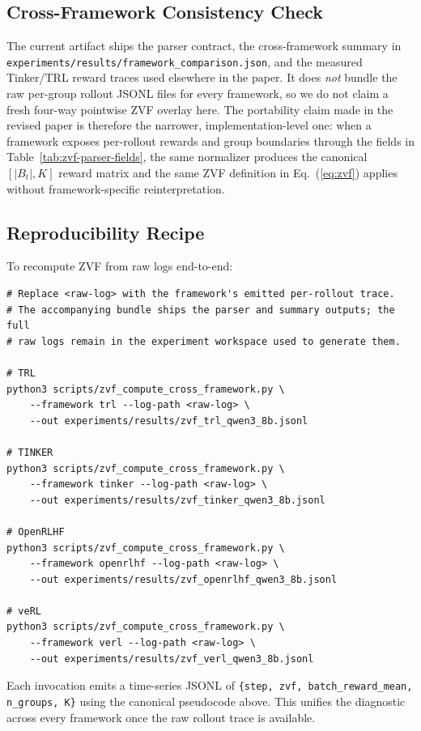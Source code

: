 \documentclass{article}
\begin{document}
\subsection{Cross-Framework Consistency Check}

The current \artifactstatusword{} artifact ships the parser contract, the
cross-framework summary in
\texttt{experiments/results/framework\_comparison.json}, and the measured
Tinker/TRL reward traces used elsewhere in the paper. It does
\emph{not} bundle the raw per-group rollout JSONL files for every framework,
so we do not claim a fresh four-way pointwise ZVF overlay here. The
portability claim made in the revised paper is therefore the narrower,
implementation-level one: when a framework exposes per-rollout rewards and
group boundaries through the fields in Table~\ref{tab:zvf-parser-fields},
the same normalizer produces the canonical $[|B_t|, K]$ reward matrix and
the same ZVF definition in Eq.~(\ref{eq:zvf}) applies without
framework-specific reinterpretation.

\subsection{Reproducibility Recipe}

To recompute ZVF from raw logs end-to-end:
\begin{verbatim}
# Replace <raw-log> with the framework's emitted per-rollout trace.
# The accompanying bundle ships the parser and summary outputs; the full
# raw logs remain in the experiment workspace used to generate them.

# TRL
python3 scripts/zvf_compute_cross_framework.py \
    --framework trl --log-path <raw-log> \
    --out experiments/results/zvf_trl_qwen3_8b.jsonl

# TINKER
python3 scripts/zvf_compute_cross_framework.py \
    --framework tinker --log-path <raw-log> \
    --out experiments/results/zvf_tinker_qwen3_8b.jsonl

# OpenRLHF
python3 scripts/zvf_compute_cross_framework.py \
    --framework openrlhf --log-path <raw-log> \
    --out experiments/results/zvf_openrlhf_qwen3_8b.jsonl

# veRL
python3 scripts/zvf_compute_cross_framework.py \
    --framework verl --log-path <raw-log> \
    --out experiments/results/zvf_verl_qwen3_8b.jsonl
\end{verbatim}
Each invocation emits a time-series JSONL of
\texttt{\{step, zvf, batch\_reward\_mean, n\_groups, K\}} using the
canonical pseudocode above. This unifies the diagnostic across every
framework once the raw rollout trace is available.
 

\end{document}
